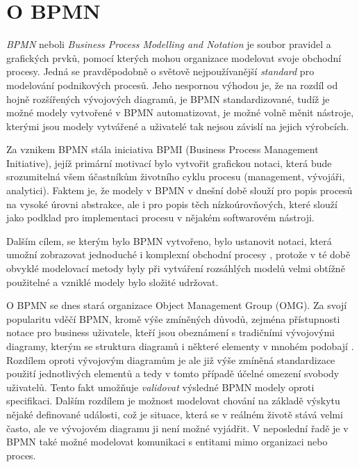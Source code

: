 \section{O BPMN}
\textit{BPMN} neboli \textit{Business Process Modelling and Notation} je soubor pravidel a grafických prvků, pomocí kterých mohou organizace modelovat svoje obchodní procesy. Jedná se pravděpodobně o světově nejpoužívanější \textit{standard} pro modelování podnikových procesů. Jeho nespornou výhodou je, že na rozdíl od hojně rozšířených vývojových diagramů, je BPMN standardizované, tudíž je možné modely vytvořené v BPMN automatizovat, je možné volně měnit nástroje, kterými jsou modely vytvářené a uživatelé tak nejsou závislí na jejich výrobcích. 

Za vznikem BPMN stála iniciativa BPMI (Business Process Management Initiative), jejíž primární motivací bylo vytvořit grafickou notaci, která bude srozumitelná všem účastníkům životního cyklu procesu (management, vývojáři, analytici). \cite{Vasicek2008} Faktem je, že modely v BPMN v dnešní době slouží pro popis procesů na vysoké úrovni abstrakce, ale i pro popis těch nízkoúrovňových, které slouží jako podklad pro implementaci procesu v nějakém softwarovém nástroji.

Dalším cílem, se kterým bylo BPMN vytvořeno, bylo ustanovit notaci, která umožní zobrazovat jednoduché i komplexní obchodní procesy \cite{Vasicek2008}, protože v té době obvyklé modelovací metody byly při vytváření rozsáhlých modelů velmi obtížně použitelné a vzniklé modely bylo složité udržovat.

O BPMN se dnes stará organizace Object Management Group (OMG). Za svojí popularitu vděčí BPMN, kromě výše zmíněných důvodů, zejména přístupnosti notace pro business uživatele, kteří jsou obeznámení s tradičními vývojovými diagramy, kterým se struktura diagramů i některé elementy v mnohém podobají \cite{Silver2011}. Rozdílem oproti vývojovým diagramům je ale již výše zmíněná standardizace použití jednotlivých elementů a tedy v tomto případě účelné omezení svobody uživatelů. Tento fakt umožňuje \textit{validovat} výsledné BPMN modely oproti specifikaci. Dalším rozdílem je možnost modelovat chování na základě výskytu nějaké definované události, což je situace, která se v reálném životě stává velmi často, ale ve vývojovém diagramu ji není možné vyjádřit. V neposlední řadě je v BPMN také možné modelovat komunikaci s entitami mimo organizaci nebo proces.

